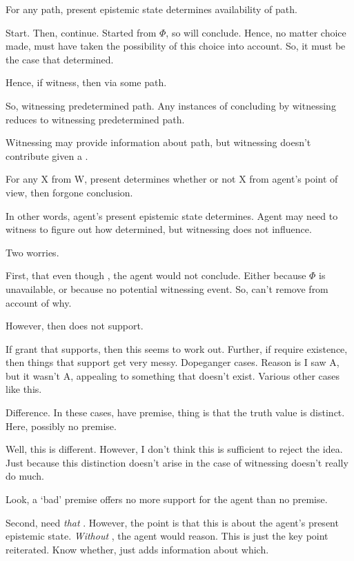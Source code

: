 \begin{note}
  \begin{proposition}
    For any path, present epistemic state determines availability of path.
  \end{proposition}

  Start.
  Then, continue.
  Started from \(\Phi\), so will conclude.
  Hence, no matter choice made, must have taken the possibility of this choice into account.
  So, it must be the case that determined.

  Hence, if witness, then via some path.

  So, witnessing predetermined path.
  Any instances of concluding by witnessing reduces to witnessing predetermined path.

  Witnessing may provide information about path, but witnessing doesn't contribute given a \requ{}.

  For any X from W,
  present determines whether or not X from agent's point of view, then forgone conclusion.

  In other words, agent's present epistemic state determines.
  Agent may need to witness to figure out how determined, but witnessing does not influence.
\end{note}

\begin{note}
  Two worries.

  First, that even though , the agent would not conclude.
  Either because \(\Phi\) is unavailable, or because no potential witnessing event.
  So, can't remove  from account of why.

  However, then  does not support.

  If grant that  supports, then this seems to work out.
  Further, if require existence, then things that support get very messy.
  Dopeganger cases.
  Reason is I saw A, but it wasn't A, appealing to something that doesn't exist.
  Various other cases like this.

  Difference.
  In these cases, have premise, thing is that the truth value is distinct.
  Here, possibly no premise.

  Well, this is different.
  However, I don't think this is sufficient to reject the idea.
  Just because this distinction doesn't arise in the case of witnessing doesn't really do much.

  Look, a `bad' premise offers no more support for the agent than no premise.

  Second, need \emph{that} .
  However, the point is that this is about the agent's present epistemic state.
  \emph{Without} , the agent would reason.
  This is just the key point reiterated.
  Know whether,  just adds information about which.
\end{note}


